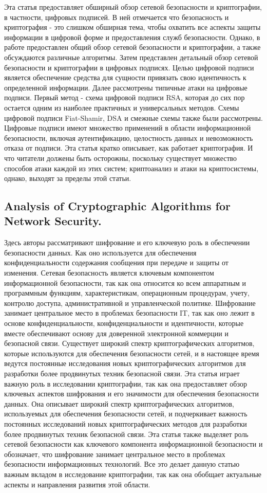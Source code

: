 \documentclass[14pt]{extarticle}
\begin{document}
Эта статья предоставляет обширный обзор сетевой безопасности и криптографии, в частности, цифровых подписей. В ней отмечается что безопасность и криптография - это слишком обширная тема, чтобы охватить все аспекты защиты информации в цифровой форме и предоставления служб безопасности. Однако, в работе предоставлен общий обзор сетевой безопасности и криптографии, а также обсуждаются различные алгоритмы. Затем представлен детальный обзор сетевой безопасности и криптографии в цифровых подписях. Целью цифровой подписи является обеспечение средства для сущности привязать свою идентичность к определенной информации. Далее рассмотрены типичные атаки на цифровые подписи. Первый метод - схема цифровой подписи RSA, которая до сих пор остается одним из наиболее практичных и универсальных методов. Схемы цифровой подписи Fiat-Shamir, DSA и смежные схемы также были рассмотрены. Цифровые подписи имеют множество применений в области информационной безопасности, включая аутентификацию, целостность данных и невозможность отказа от подписи.
Эта статья кратко описывает, как работает криптография. И что читатели должены быть осторожны, поскольку существует множество способов атаки каждой из этих систем; криптоанализ и атаки на криптосистемы, однако, выходят за пределы этой статьи.


\subsection{Analysis of Cryptographic Algorithms for Network
Security.\cite{Article3}}
Здесь авторы рассматривают шифрование и его ключевую роль в обеспечении безопасности данных. Как оно используется для обеспечения конфиденциальности
содержания сообщения при передаче и защиты от изменения. Сетевая безопасность является ключевым компонентом информационной безопасности, так как она относится ко всем аппаратным и программным функциям, характеристикам, операционным процедурам, учету, контролю доступа, административной и управленческой политике. Шифрование занимает центральное место в проблемах безопасности IT, так как оно лежит в основе конфиденциальности, конфиденциальности и идентичности, которые вместе обеспечивают основу для доверенной электронной коммерции и безопасной связи. Существует широкий спектр криптографических алгоритмов, которые используются для обеспечения безопасности сетей, и в настоящее время ведутся постоянные исследования новых криптографических алгоритмов для разработки более
продвинутых техник безопасной связи. Эта статья играет важную роль в исследовании криптографии, так как она предоставляет обзор ключевых аспектов шифрования и его значимости для обеспечения безопасности данных. Она описывает широкий спектр криптографических алгоритмов, используемых для обеспечения безопасности сетей, и подчеркивает важность постоянных исследований новых криптографических методов для разработки более продвинутых техник безопасной связи. Эта статья также выделяет роль сетевой безопасности как ключевого компонента информационной безопасности и обозначает, что шифрование занимает центральное место в проблемах безопасности информационных технологий. Все это делает данную статью важным вкладом в исследование криптографии, так как она обобщает актуальные аспекты и направления развития этой области.
\end{document}
